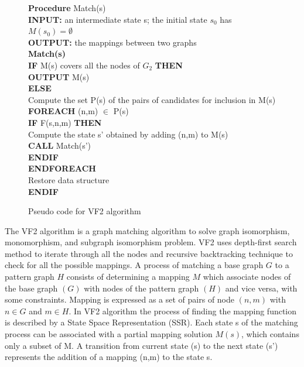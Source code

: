 \begin{figure}

\begin{algorithm}[H]
\begin{algorithmic}
 \LState  \textbf{Procedure} Match(s)\\
\textbf{INPUT:}  an intermediate state s; the initial state $s_0$ has $M(s_0)=\emptyset$\\
\textbf{OUTPUT:} the mappings between two graphs\\
\textbf{Match(s)}\\
 \textbf{IF} M(s) covers all the nodes of $G_2$ \textbf{THEN}\\
\quad \textbf{OUTPUT} M(s)\\
\textbf{ELSE}\\
 \quad    Compute the set P(s) of the pairs of candidates for inclusion in M(s)\\
\quad\textbf{FOREACH} (n,m) $\in$ P(s)\\
\quad\quad\textbf{IF} F(s,n,m) \textbf{THEN}\\
\quad\quad\quad    Compute the state s' obtained by adding (n,m) to M(s)\\
\quad\quad\quad\textbf{CALL} Match(s')\\
\quad\quad\textbf{ENDIF}\\
\quad\textbf{ENDFOREACH}\\
\quad Restore data structure\\
\textbf{ENDIF}\\

\end{algorithmic}
\end{algorithm}
\caption{Pseudo code for VF2 algorithm\cite{cordella2001improved}}
\label{fig:VF2}
\end{figure}


The VF2 algorithm is a graph matching algorithm to solve graph isomorphism, monomorphism, and  subgraph isomorphism problem. VF2 uses depth-first search method to iterate through all the nodes and recursive backtracking technique to check for all the possible mappings. A process of matching 
a base graph $G$ to a pattern graph $H$ consists of determining a mapping $M$ which associate nodes of the base graph $(G)$ with nodes of the pattern graph $(H)$ and vice versa, with some constraints.
Mapping is expressed as a set of pairs of node $(n,m)$ with $n \in G$ and $m \in H$. 
In VF2 algorithm the process of finding the mapping function is described by a  State Space Representation (SSR). Each state s of the matching process can be associated with a partial mapping solution $M(s)$,
which contains only a subset of M. A transition from current state (s) to the next state (s') represents the addition of a mapping (n,m) to the state s.

